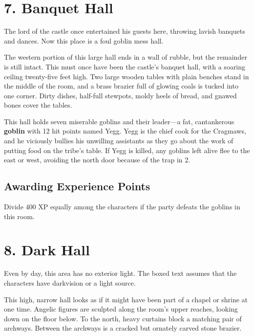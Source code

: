 \documentclass[10pt,a4paper,twoside,bg=print,twocolumn,openany,nodeprecatedcode]{dndbook}
\begin{document}
\section{7. Banquet Hall}
The lord of the castle once entertained his guests here, throwing lavish banquets and dances. Now this place is a foul goblin mess hall.

\begin{DndReadAloud}{}
The western portion of this large hall ends in a wall of rubble, but the remainder is still intact. This must once have been the castle's banquet hall, with a soaring ceiling twenty-five feet high. Two large wooden tables with plain benches stand in the middle of the room, and a brass brazier full of glowing coals is tucked into one corner. Dirty dishes, half-full stewpots, moldy heels of bread, and gnawed bones cover the tables.

\end{DndReadAloud}

This hall holds seven miserable goblins and their leader—a fat, cantankerous \textbf{goblin} with 12 hit points named Yegg. Yegg is the chief cook for the Cragmaws, and he viciously bullies his unwilling assistants as they go about the work of putting food on the tribe's table. If Yegg is killed, any goblins left alive flee to the east or west, avoiding the north door because of the trap in 2.

\subsection{Awarding Experience Points}
Divide 400 XP equally among the characters if the party defeats the goblins in this room.

\section{8. Dark Hall}
Even by day, this area has no exterior light. The boxed text assumes that the characters have darkvision or a light source.

\begin{DndReadAloud}{}
This high, narrow hall looks as if it might have been part of a chapel or shrine at one time. Angelic figures are sculpted along the room's upper reaches, looking down on the floor below. To the north, heavy curtains block a matching pair of archways. Between the archways is a cracked but ornately carved stone brazier.

\end{DndReadAloud}
\end{document}
